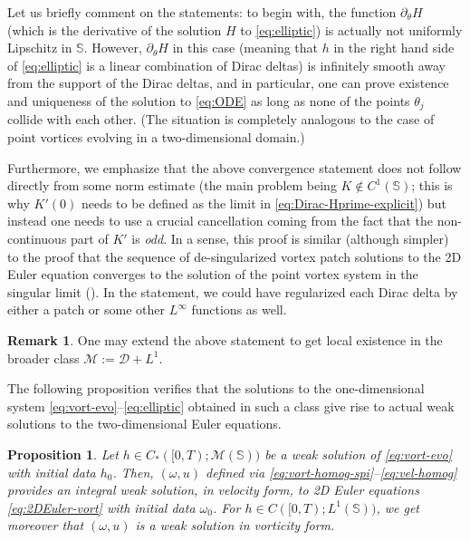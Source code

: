 \documentclass[JEP,XML,SOM,Unicode,NoFloatCountersInSection,published]{cedram}
\theoremstyle{plain}
\newtheorem{proposition}[theorem]{Proposition}
\theoremstyle{definition}
\newtheorem{remark}[theorem]{Remark}
\let\tht\theta
\let\omg\omega
\newcommand{\bbS}{\mathbb S}
\newcommand{\calD}{\mathcal D}
\newcommand{\calM}{\mathcal M}
\begin{document}
Let us briefly comment on the statements: to begin with, the function $\partial_{\theta} H$ (which is the derivative of the solution $H$ to \eqref{eq:elliptic}) is actually not uniformly Lipschitz in $\bbS$. However, $\partial_{\theta} H$ in this case (meaning that $h$ in the right hand side of \eqref{eq:elliptic} is a linear combination of Dirac deltas) is infinitely smooth away from the support of the Dirac deltas, and in particular, one can prove existence and uniqueness of the solution to \eqref{eq:ODE} as long as none of the points $\tht_{j}$ collide with each other. (The situation is completely analogous to the case of point vortices evolving in a two-dimensional domain.)

Furthermore, we emphasize that the above convergence statement does not follow directly from some norm estimate (the main problem being $K \notin C^1(\bbS)$; this is why $K'(0)$ needs to be defined as the limit in \eqref{eq:Dirac-Hprime-explicit}) but instead one needs to use a crucial cancellation coming from the fact that the non-continuous part of $K'$ is \textit{odd}. In a sense, this proof is similar (although simpler) to the proof that the sequence of de-singularized vortex patch solutions to the 2D Euler equation converges to the solution of the point vortex system in the singular limit (\cite{MP}). In the statement, we could have regularized each Dirac delta by either a patch or some other $L^\infty$ functions as well.

\begin{remark} One may extend the above statement to get local existence in the broader class $\calM := \calD+L^1$.
\end{remark}

The following proposition verifies that the solutions to the one-dimensional system \eqref{eq:vort-evo}--\eqref{eq:elliptic} obtained in such a class give rise to actual weak solutions to the two-dimensional Euler equations.
\begin{proposition}\label{prop:back-to-2D}
Let $h \in C_*([0,T);\calM(\bbS))$ be a weak solution of \eqref{eq:vort-evo} with initial data $h_0$. Then, $(\omg, u)$ defined via \eqref{eq:vort-homog-spi}--\eqref{eq:vel-homog} provides an integral weak solution, in velocity form, to 2D Euler equations \eqref{eq:2DEuler-vort} with initial data $\omg_0$. For $h \in C([0,T);L^1(\bbS))$, we get moreover that $(\omg, u)$ is a weak solution in vorticity form.
\end{proposition}
\end{document}
